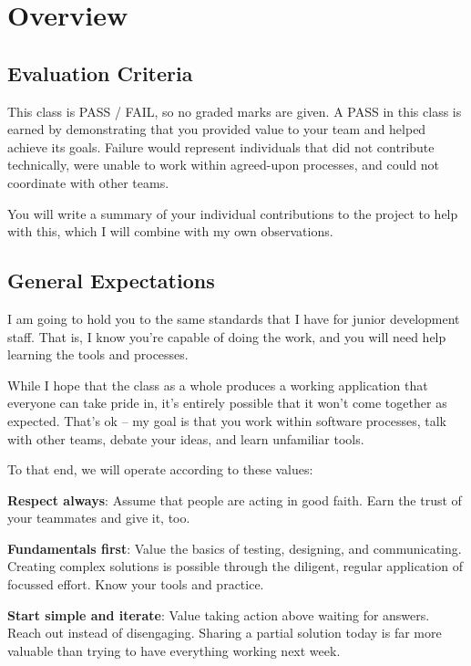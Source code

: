 \documentclass{article}
\newcommand{\enterProblemHeader}[1]{
}
\newcommand{\exitProblemHeader}[1]{
\nobreak\extramarks{#1}{}\nobreak
}
\newcounter{homeworkProblemCounter} %
\newcommand{\homeworkProblemName}{}
\newenvironment{homeworkProblem}[1][Problem \arabic{homeworkProblemCounter}]{ %
\stepcounter{homeworkProblemCounter} %
\renewcommand{\homeworkProblemName}{#1} %
\section{\homeworkProblemName} %
\enterProblemHeader{\homeworkProblemName} %
}{
\exitProblemHeader{\homeworkProblemName} %
}
\newcommand{\homeworkSectionName}{}
\newenvironment{homeworkSection}[1]{ %
\renewcommand{\homeworkSectionName}{#1} %
\subsection{\homeworkSectionName} %
\enterProblemHeader{\homeworkProblemName\ [\homeworkSectionName]} %
}{
\enterProblemHeader{\homeworkProblemName} %
}
\begin{document}
\begin{homeworkProblem}[Overview]
\begin{homeworkSection}{Evaluation Criteria}
	This class is PASS / FAIL, so no graded marks are given. A PASS in this class is earned by demonstrating that you provided value to your team and helped achieve its goals. Failure would represent individuals that did not contribute technically, were unable to work within agreed-upon processes, and could not coordinate with other teams.
	
	You will write a summary of your individual contributions to the project to help with this, which I will combine with my own observations.
\end{homeworkSection}


\begin{homeworkSection}{General Expectations}
	I am going to hold you to the same standards that I have for junior development staff. That is, I know you're capable of doing the work, and you will need help learning the tools and processes.

	While I hope that the class as a whole produces a working application that everyone can take pride in, it's entirely possible that it won't come together as expected. That's ok -- my goal is that you work within software processes, talk with other teams, debate your ideas, and learn unfamiliar tools.

	To that end, we will operate according to these values:

	\begin{compactitem}
		\item \textbf{Respect always}: Assume that people are acting in good faith. Earn the trust of your teammates and give it, too.
		\item \textbf{Fundamentals first}: Value the basics of testing, designing, and communicating. Creating complex solutions is possible through the diligent, regular application of focussed effort. Know your tools and practice.
		\item \textbf{Start simple and iterate}: Value taking action above waiting for answers. Reach out instead of disengaging. Sharing a partial solution today is far more valuable than trying to have everything working next week.
	\end{compactitem}
\end{homeworkSection}

\end{homeworkProblem}
\end{document}
